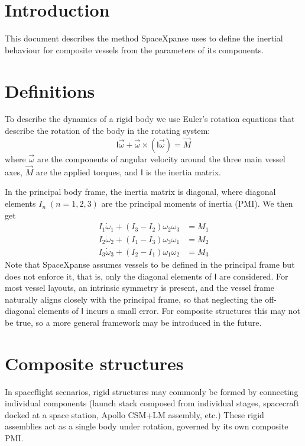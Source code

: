 \documentclass[a4paper]{article}
\newcommand\mat[1]{\mathsf{#1}}
\begin{document}
\maketitle

\section{Introduction}
This document describes the method SpaceXpanse uses to define the inertial behaviour for composite vessels from the parameters of its components.

\section{Definitions}
To describe the dynamics of a rigid body we use Euler's rotation equations that describe the rotation of the body in the rotating system:
\begin{equation}
\mat{I} \dot{\vec{\omega}} + \vec{\omega} \times (\mat{I}\vec{\omega}) = \vec{M}
\end{equation}
where $\vec{\omega}$ are the components of angular velocity around the three main vessel axes, $\vec{M}$ are the applied torques, and $\mat{I}$ is the inertia matrix.

In the principal body frame, the inertia matrix is diagonal, where diagonal elements $I_n\;(n=1,2,3)$ are the principal moments of inertia (PMI). We then get
\begin{equation}
\begin{split}
  I_1 \dot\omega_1 + (I_3 - I_2) \omega_2 \omega_3 &= M_1 \\
  I_2 \dot\omega_2 + (I_1 - I_3) \omega_3 \omega_1 &= M_2 \\
  I_3 \dot\omega_3 + (I_2 - I_1) \omega_1 \omega_2 &= M_3
\end{split}
\end{equation}
Note that SpaceXpanse assumes vessels to be defined in the principal frame but does not enforce it, that is, only the diagonal elements of $\mat{I}$ are considered. For most vessel layouts, an intrinsic symmetry is present, and the vessel frame naturally aligns closely with the principal frame, so that neglecting the off-diagonal elements of $\mat{I}$ incurs a small error. For composite structures this may not be true, so a more general framework may be introduced in the future. 

\section{Composite structures}
In spaceflight scenarios, rigid structures may commonly be formed by connecting individual components (launch stack composed from individual stages, spacecraft docked at a space station, Apollo CSM+LM assembly, etc.) These rigid assemblies act as a single body under rotation, governed by its own composite PMI.
\end{document}
